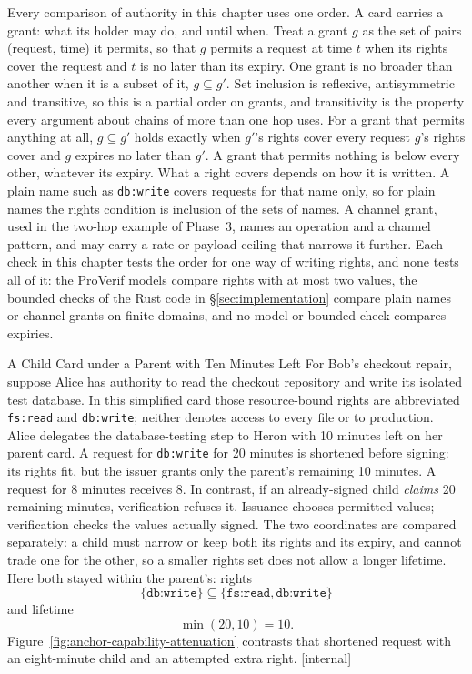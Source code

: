 \documentclass[11pt,a4paper]{article}
\theoremstyle{definition}
\begin{document}
Every comparison of authority in this chapter uses one order. A card carries a grant: what its holder may do, and until when. Treat a grant $g$ as the set of pairs (request, time) it permits, so that $g$ permits a request at time $t$ when its rights cover the request and $t$ is no later than its expiry. One grant is no broader than another when it is a subset of it, $g \subseteq g'$. Set inclusion is reflexive, antisymmetric and transitive, so this is a partial order on grants, and transitivity is the property every argument about chains of more than one hop uses. For a grant that permits anything at all, $g \subseteq g'$ holds exactly when $g'$'s rights cover every request $g$'s rights cover and $g$ expires no later than $g'$. A grant that permits nothing is below every other, whatever its expiry. What a right covers depends on how it is written. A plain name such as \texttt{db:write} covers requests for that name only, so for plain names the rights condition is inclusion of the sets of names. A channel grant, used in the two-hop example of Phase~3, names an operation and a channel pattern, and may carry a rate or payload ceiling that narrows it further. Each check in this chapter tests the order for one way of writing rights, and none tests all of it: the ProVerif models compare rights with at most two values, the bounded checks of the Rust code in \S\ref{sec:implementation} compare plain names or channel grants on finite domains, and no model or bounded check compares expiries.
\begin{pdexample}{A Child Card under a Parent with Ten Minutes Left}
\setlength{\parskip}{4pt plus 1pt}
For Bob's checkout repair, suppose Alice has authority to read the checkout
repository and write its isolated test database. In this simplified card those
resource-bound rights are abbreviated \texttt{fs:read} and \texttt{db:write};
neither denotes access to every file or to production. Alice delegates the
database-testing step to Heron with 10 minutes left on her parent card. A request for \texttt{db:write} for 20 minutes is shortened before signing:
its rights fit, but the issuer grants only the parent's remaining 10 minutes.
A request for 8 minutes receives 8. In contrast, if an already-signed child
\emph{claims} 20 remaining minutes, verification refuses it. Issuance chooses
permitted values; verification checks the values actually signed.
The two coordinates are compared separately: a child must narrow or keep both
its rights and its expiry, and cannot trade one for the other, so a smaller
rights set does not allow a longer lifetime. Here both stayed within the
parent's: rights
\[
\{\texttt{db:write}\} \subseteq \{\texttt{fs:read},\texttt{db:write}\}
\]
and
lifetime
\[
\min(20, 10) = 10.
\]
Figure~\ref{fig:anchor-capability-attenuation}
contrasts that shortened request with an eight-minute child and an attempted extra right. [internal]
\end{pdexample}
\end{document}
